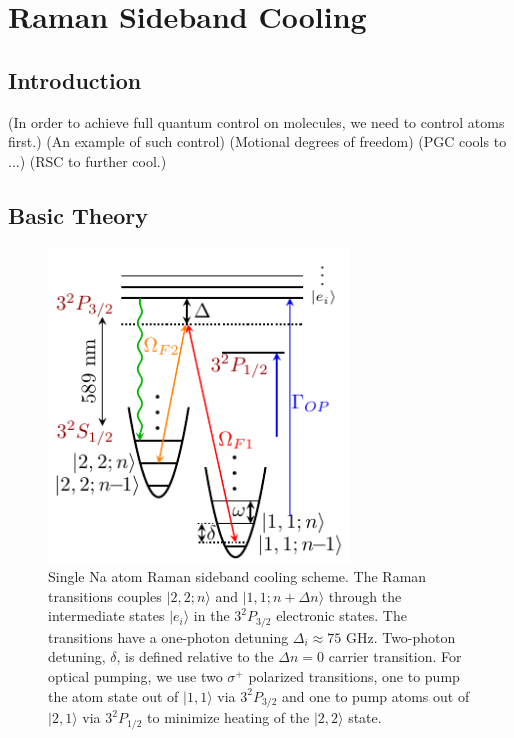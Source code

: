 
\chapter{Raman Sideband Cooling}
\label{ch:rsc}

\section{Introduction}
(In order to achieve full quantum control on molecules, we need to control atoms first.)
(An example of such control)
(Motional degrees of freedom)
(PGC cools to ...)
(RSC to further cool.)

\section{Basic Theory}
\label{ch:rsc-basic-theory}

\begin{figure}
  \centering
  \includegraphics[width=8cm]{figures/na_rsc_schematics.pdf}
  \caption[Schematics of Raman sideband cooling for Sodium.]{
    Single Na atom Raman sideband cooling scheme.
    The Raman transitions couples $|2,2;n\rangle$ and $|1,1;n+\Delta n\rangle$
    through the intermediate states $|e_i\rangle$ in the $3^2P_{3/2}$ electronic states.
    The transitions have a one-photon detuning $\Delta_i\approx75$ GHz.
    Two-photon detuning, $\delta$, is defined relative to the $\Delta n=0$ carrier transition.
    For optical pumping, we use two $\sigma^+$ polarized transitions,
    one to pump the atom state out of $|1,1\rangle$ via $3^2P_{3/2}$
    and one to pump atoms out of $|2,1\rangle$ via $3^2P_{1/2}$
    to minimize heating of the $|2,2\rangle$ state.
    \label{fig:na-rsc-schematics}}
\end{figure}

